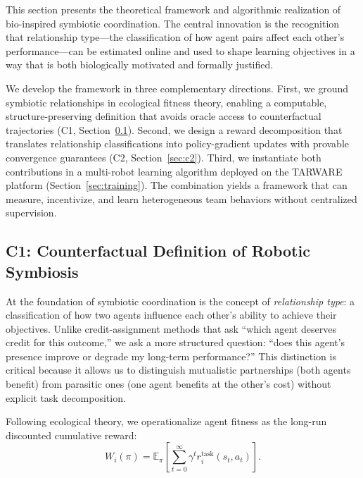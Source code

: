 \documentclass[Afour,sageh,times]{sagej}
\begin{document}
This section presents the theoretical framework and algorithmic realization of bio-inspired symbiotic coordination. The central innovation is the recognition that relationship type---the classification of how agent pairs affect each other's performance---can be estimated online and used to shape learning objectives in a way that is both biologically motivated and formally justified. 

We develop the framework in three complementary directions. First, we ground symbiotic relationships in ecological fitness theory, enabling a computable, structure-preserving definition that avoids oracle access to counterfactual trajectories (C1, Section~\ref{sec:c1}). Second, we design a reward decomposition that translates relationship classifications into policy-gradient updates with provable convergence guarantees (C2, Section~\ref{sec:c2}). Third, we instantiate both contributions in a multi-robot learning algorithm deployed on the TARWARE platform (Section~\ref{sec:training}). The combination yields a framework that can measure, incentivize, and learn heterogeneous team behaviors without centralized supervision.

\subsection{C1: Counterfactual Definition of Robotic Symbiosis}
\label{sec:c1}

At the foundation of symbiotic coordination is the concept of \emph{relationship type}: a classification of how two agents influence each other's ability to achieve their objectives. Unlike credit-assignment methods that ask ``which agent deserves credit for this outcome,'' we ask a more structured question: ``does this agent's presence improve or degrade my long-term performance?'' This distinction is critical because it allows us to distinguish mutualistic partnerships (both agents benefit) from parasitic ones (one agent benefits at the other's cost) without explicit task decomposition.

Following ecological theory, we operationalize agent fitness as the long-run discounted cumulative reward:
\begin{equation}
    W_i(\pi) = \mathbb{E}_\pi\!\left[\sum_{t=0}^\infty \gamma^t r_i^{\mathrm{task}}(s_t, a_t)\right].
    \label{eq:fitness}
\end{equation}
\end{document}
